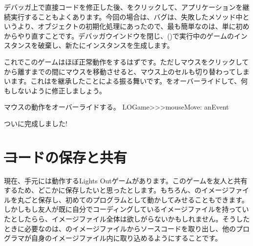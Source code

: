 \documentclass[a4paper,10pt,twoside]{book}
\begin{document}
デバッガ上で直接コードを修正した後、をクリックして、アプリケーションを継続実行することもよくあります。今回の場合は、バグは、失敗したメソッド中というより、オブジェクトの初期化処理にあったので、最も簡単なのは、単に初めからやり直すことです。デバッガウインドウを閉じ、()で実行中のゲームのインスタンスを破棄し、新たにインスタンスを生成します。



これでこのゲームはほぼ正常動作をするはずです。ただしマウスをクリックしてから離すまでの間にマウスを移動させると、マウス上のセルも切り替わってしまいます。これはを継承したことによる振る舞いです。をオーバーライドして、何もしないように修正しましょう。

\begin{method}[mouseMove:]{マウスの動作をオーバーライドする。}
LOGame>>>mouseMove: anEvent
\end{method}

ついに完成しました!


\section{\st コードの保存と共有}

現在、手元には動作するLights Outゲームがあります。このゲームを友人と共有するため、どこかに保存したいと思ったとします。もちろん、\pharo のイメージファイルを丸ごと保存し、初めてのプログラムとして動かしてみせることもできます。しかしもし友人が既に自分でコーディングしているイメージファイルを持っていたとしたらら、イメージファイル全体は欲しがらないかもしれません。そうしたときに必要なのは、\pharo のイメージファイルからソースコードを取り出し、他のプログラマが自身のイメージファイル内に取り込めるようにすることです。
\end{document}
